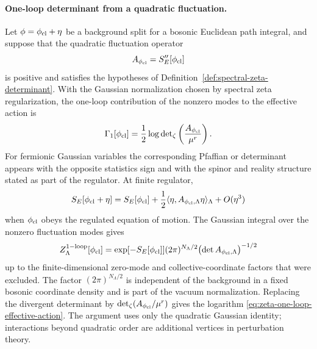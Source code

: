 \paragraph{One-loop determinant from a quadratic fluctuation.}
Let \(\phi=\phi_{\rm cl}+\eta\) be a background split for a bosonic Euclidean
path integral, and suppose that the quadratic fluctuation operator
\[
  A_{\phi_{\rm cl}}
  =
  S_E''[\phi_{\rm cl}]
\]
is positive and satisfies the hypotheses of
Definition~\ref{def:spectral-zeta-determinant}.  With the Gaussian
normalization chosen by spectral zeta regularization, the one-loop
contribution of the nonzero modes to the effective action is
\begin{equation}
  \Gamma_{1}[\phi_{\rm cl}]
  =
  \frac12
  \log\det\nolimits_{\zeta}\left(\frac{A_{\phi_{\rm cl}}}{\mu^r}\right).
  \label{eq:zeta-one-loop-effective-action}
\end{equation}
For fermionic Gaussian variables the corresponding Pfaffian or determinant
appears with the opposite statistics sign and with the spinor and reality
structure stated as part of the regulator.
At finite regulator,
\[
  S_E[\phi_{\rm cl}+\eta]
  =
  S_E[\phi_{\rm cl}]
  +
  \frac12\langle\eta,A_{\phi_{\rm cl},\Lambda}\eta\rangle_\Lambda
  +
  O(\eta^3)
\]
when \(\phi_{\rm cl}\) obeys the regulated equation of motion.  The Gaussian
integral over the nonzero fluctuation modes gives
\[
  Z_{\Lambda}^{\rm 1-loop}[\phi_{\rm cl}]
  =
  \exp[-S_E[\phi_{\rm cl}]]
  (2\pi)^{N_\Lambda/2}
  \bigl(\det A_{\phi_{\rm cl},\Lambda}\bigr)^{-1/2}
\]
up to the finite-dimensional zero-mode and collective-coordinate factors that
were excluded.  The factor \((2\pi)^{N_\Lambda/2}\) is independent of the
background in a fixed bosonic coordinate density and is part of the vacuum
normalization.  Replacing the divergent determinant by
\(\det_\zeta(A_{\phi_{\rm cl}}/\mu^r)\) gives the logarithm
\eqref{eq:zeta-one-loop-effective-action}.  The argument uses only the
quadratic Gaussian identity; interactions beyond quadratic order are
additional vertices in perturbation theory.

